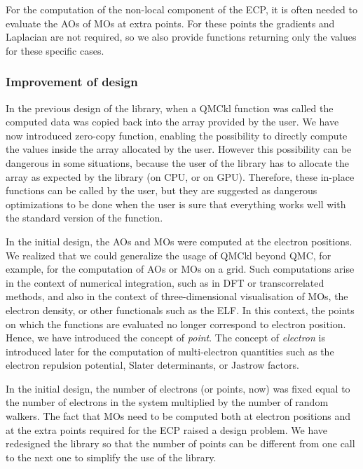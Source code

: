 For the computation of the non-local component of the
\ac{ECP}, it is often needed to evaluate the \acp{AO} of
\acp{MO} at extra points. For these points the gradients and
Laplacian are not required, so we also provide functions returning only
the values for these specific cases.


\subsubsection{Improvement of design}

In the previous design of the library, when a QMCkl function was called the computed
data was copied back into the array provided by the user. We have now
introduced zero-copy function, enabling the possibility to directly compute the
values inside the array allocated by the user. However this possibility
can be dangerous in some situations, because the user of the library has to allocate
the array as expected by the library (on CPU, or on GPU). Therefore, these in-place functions
can be called by the user, but they are suggested as dangerous
optimizations to be done when the user is sure that everything works
well with the standard version of the function.

In the initial design, the \acp{AO} and \acp{MO} were computed at the
electron positions. We realized that we could generalize the
usage of QMCkl beyond QMC, for example, for the computation of
\acp{AO} or \acp{MO} on a grid. Such computations arise in the context
of numerical integration, such as in \ac{DFT} or transcorrelated methods,
and also in the context of three-dimensional visualisation of \acp{MO},
the electron density, or other functionals such as the \ac{ELF}.\cite{silvi_1994}
In this context, the points on which the functions are evaluated no longer
correspond to electron position. Hence, we have introduced the concept of
\emph{point}.  The concept of \emph{electron} is introduced later for the
computation of multi-electron quantities such as the electron repulsion potential,
Slater determinants, or Jastrow factors. 

In the initial design, the number of electrons (or points,
now) was fixed equal to the number of electrons in the system
multiplied by the number of random walkers. The fact that \acp{MO} need to be
computed both at electron positions and at the extra points required
for the \ac{ECP} raised a design problem. We have redesigned
the library so that the number of points can be different from one
call to the next one to simplify the use of the library.

